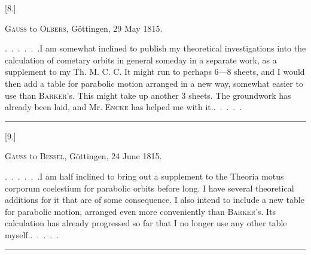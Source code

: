 \clearpage
{}
\begin{center}
[8.]\par
\medskip
\textsc{Gauss} to \textsc{Olbers}, Göttingen, 29 May 1815.
\end{center}
\noindent\hspace*{\parindent}.\ .\ .\ .\ .\ .\quad I am somewhat inclined to publish my theoretical investigations into the calculation of cometary orbits in general someday in a separate work, as a supplement to my Th. M. C. C. It might run to perhaps 6—8 sheets, and I would then add a table for parabolic motion arranged in a new way, somewhat easier to use than \textsc{Barker}'s. This might take up another 3 sheets. The groundwork has already been laid, and Mr. \textsc{Encke} has helped me with it.\quad .\ .\ .\ .\ .
\par\medskip
\begin{center}\rule{.18\textwidth}{.4pt}\end{center}
\medskip
{}
\begin{center}
[9.]\par
\medskip
\textsc{Gauss} to \textsc{Bessel}, Göttingen, 24 June 1815.
\end{center}
\noindent\hspace*{\parindent}.\ .\ .\ .\ .\ .\quad I am half inclined to bring out a supplement to the Theoria motus corporum coelestium for parabolic orbits before long. I have several theoretical additions for it that are of some consequence. I also intend to include a new table for parabolic motion, arranged even more conveniently than \textsc{Barker}'s. Its calculation has already progressed so far that I no longer use any other table myself.\quad .\ .\ .\ .\ .
\par\medskip
\begin{center}\rule{.22\textwidth}{.4pt}\end{center}

